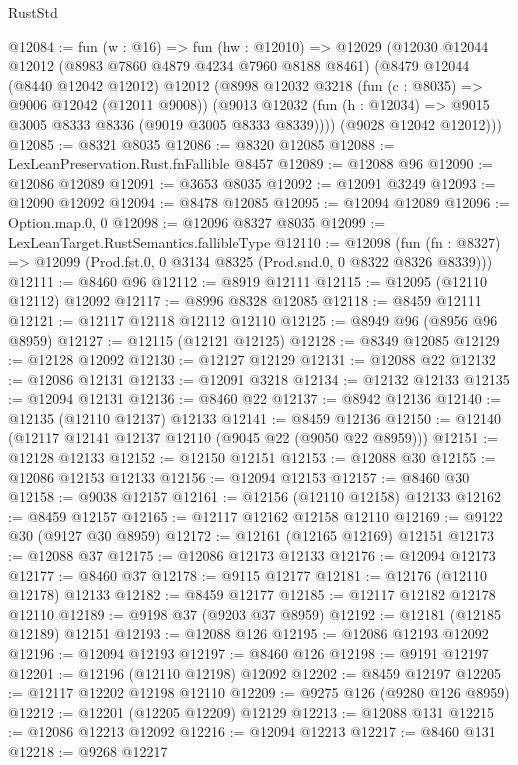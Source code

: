 \begin{lexlean}{RustStd}
\begin{coremodule}
@12084 := fun (w : @16) =>
  fun (hw : @12010) =>
  @12029
    (@12030
      @12044
      @12012
      (@8983 @7860 @4879 @4234 @7960 @8188 @8461)
      (@8479
        @12044
        (@8440 @12042 @12012)
        @12012
        (@8998
          @12032
          @3218
          (fun (c : @8035) => @9006 @12042 (@12011 @9008))
          (@9013 @12032 (fun (h : @12034) => @9015 @3005 @8333 @8336 (@9019 @3005 @8333 @8339))))
        (@9028 @12042 @12012)))
@12085 := @8321 @8035
@12086 := @8320 @12085
@12088 := LexLeanPreservation.Rust.fnFallible @8457
@12089 := @12088 @96
@12090 := @12086 @12089
@12091 := @3653 @8035
@12092 := @12091 @3249
@12093 := @12090 @12092
@12094 := @8478 @12085
@12095 := @12094 @12089
@12096 := Option.map.{0, 0}
@12098 := @12096 @8327 @8035
@12099 := LexLeanTarget.RustSemantics.fallibleType
@12110 := @12098
    (fun (fn : @8327) => @12099 (Prod.fst.{0, 0} @3134 @8325 (Prod.snd.{0, 0} @8322 @8326 @8339)))
@12111 := @8460 @96
@12112 := @8919 @12111
@12115 := @12095 (@12110 @12112) @12092
@12117 := @8996 @8328 @12085
@12118 := @8459 @12111
@12121 := @12117 @12118 @12112 @12110
@12125 := @8949 @96 (@8956 @96 @8959)
@12127 := @12115 (@12121 @12125)
@12128 := @8349 @12085
@12129 := @12128 @12092
@12130 := @12127 @12129
@12131 := @12088 @22
@12132 := @12086 @12131
@12133 := @12091 @3218
@12134 := @12132 @12133
@12135 := @12094 @12131
@12136 := @8460 @22
@12137 := @8942 @12136
@12140 := @12135 (@12110 @12137) @12133
@12141 := @8459 @12136
@12150 := @12140 (@12117 @12141 @12137 @12110 (@9045 @22 (@9050 @22 @8959)))
@12151 := @12128 @12133
@12152 := @12150 @12151
@12153 := @12088 @30
@12155 := @12086 @12153 @12133
@12156 := @12094 @12153
@12157 := @8460 @30
@12158 := @9038 @12157
@12161 := @12156 (@12110 @12158) @12133
@12162 := @8459 @12157
@12165 := @12117 @12162 @12158 @12110
@12169 := @9122 @30 (@9127 @30 @8959)
@12172 := @12161 (@12165 @12169) @12151
@12173 := @12088 @37
@12175 := @12086 @12173 @12133
@12176 := @12094 @12173
@12177 := @8460 @37
@12178 := @9115 @12177
@12181 := @12176 (@12110 @12178) @12133
@12182 := @8459 @12177
@12185 := @12117 @12182 @12178 @12110
@12189 := @9198 @37 (@9203 @37 @8959)
@12192 := @12181 (@12185 @12189) @12151
@12193 := @12088 @126
@12195 := @12086 @12193 @12092
@12196 := @12094 @12193
@12197 := @8460 @126
@12198 := @9191 @12197
@12201 := @12196 (@12110 @12198) @12092
@12202 := @8459 @12197
@12205 := @12117 @12202 @12198 @12110
@12209 := @9275 @126 (@9280 @126 @8959)
@12212 := @12201 (@12205 @12209) @12129
@12213 := @12088 @131
@12215 := @12086 @12213 @12092
@12216 := @12094 @12213
@12217 := @8460 @131
@12218 := @9268 @12217

\end{coremodule}
\end{lexlean}
